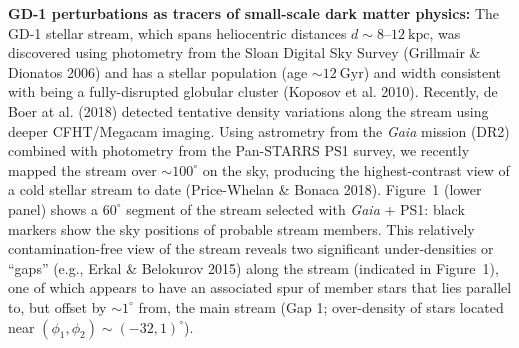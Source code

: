 \documentclass[11pt]{article}
\begin{document}
\textbf{GD-1 perturbations as tracers of small-scale dark matter physics:}
The GD-1 stellar stream, which spans heliocentric distances $d\sim 8$--$12~\textrm{kpc}$, was discovered using photometry from the Sloan Digital Sky Survey (Grillmair \& Dionatos 2006) and has a stellar population (age $\sim 12~\textrm{Gyr}$) and width consistent with being a fully-disrupted globular cluster (Koposov et al. 2010).
Recently, de Boer at al. (2018) detected tentative density variations along the stream using deeper CFHT/Megacam imaging.
Using astrometry from the \textit{Gaia} mission (DR2) combined with photometry from the Pan-STARRS PS1 survey, we recently mapped the stream over $\sim 100^\circ$ on the sky, producing the highest-contrast view of a cold stellar stream to date (Price-Whelan \& Bonaca 2018).
Figure~1 (lower panel) shows a $60^\circ$ segment of the stream selected with \textit{Gaia} + PS1: black markers show the sky positions of probable stream members.
This relatively contamination-free view of the stream reveals two significant under-densities or ``gaps'' (e.g., Erkal \& Belokurov 2015) along the stream (indicated in Figure~1), one of which appears to have an associated spur of member stars that lies parallel to, but offset by $\sim1^\circ$ from, the main stream (Gap 1; over-density of stars located near $(\phi_1, \phi_2) \sim (-32, 1)^\circ$).
\end{document}
